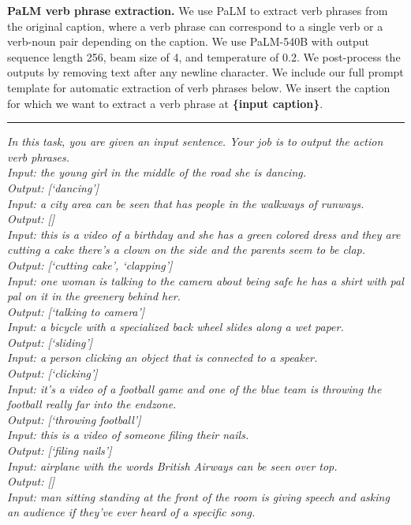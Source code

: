 \noindent\textbf{PaLM verb phrase extraction.} We use PaLM to extract verb phrases from the original caption, where a verb phrase can correspond to a single verb or a verb-noun pair depending on the caption. We use PaLM-540B with output sequence length 256, beam size of 4,  and temperature of 0.2. We post-process the outputs by removing text after any newline character. We include our full prompt template for automatic extraction of verb phrases below. We insert the caption for which we want to extract a verb phrase at \textbf{\{input caption\}}. \\
\noindent\rule{8.5cm}{0.4pt}
\textit{In this task, you are given an input sentence. Your job is to output the action verb phrases. \\
Input: the young girl in the middle of the road she is dancing. \\
Output:  [`dancing'] \\
Input: a city area can be seen that has people in the walkways of runways. \\
Output: [] \\
Input: this is a video of a birthday and she has a green colored dress and they are cutting a cake there's a clown on the side and the parents seem to be clap. \\
Output: [`cutting cake', `clapping'] \\
Input: one woman is talking to the camera about being safe he has a shirt with pal pal on it in the greenery behind her.  \\
Output: [`talking to camera'] \\
Input: a bicycle with a specialized back wheel slides along a wet paper. \\
Output: [`sliding'] \\
Input: a person clicking an object that is connected to a speaker. \\
Output: [`clicking'] \\
Input: it's a video of a football game and one of the blue team is throwing the football really far into the endzone. \\
Output: [`throwing football'] \\
Input: this is a video of someone filing their nails. \\
Output: [`filing nails'] \\
Input: airplane with the words British Airways can be seen over top. \\
Output: [] \\
Input: man sitting standing at the front of the room is giving speech and asking an audience if they've ever heard of a specific song. \\
}
